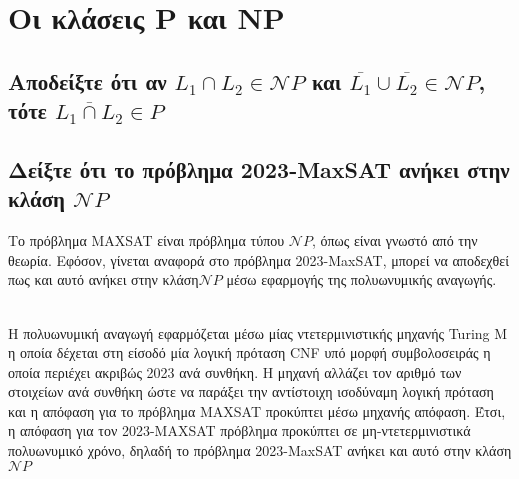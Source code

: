\section{Οι κλάσεις P και NP}

\subsection{Αποδείξτε ότι αν $L_1 \cap L_2 \in \mathcal{N}P$ και $\overline{L_1} \cup \overline{L_2} \in \mathcal{N}P$, τότε $\overline{L_1 \cap L_2} \in P$}
\subsection{Δείξτε ότι  το πρόβλημα 2023-MaxSAT ανήκει στην κλάση $\mathcal{N}P$}
\label{max_sat}
Το πρόβλημα MAXSAT είναι πρόβλημα τύπου $\mathcal{N}P$, όπως είναι γνωστό από την θεωρία. Εφόσον, γίνεται αναφορά στο πρόβλημα 2023-MaxSAT, μπορεί να αποδεχθεί πως και αυτό ανήκει στην κλάση$\mathcal{N}P$ μέσω εφαρμογής της πολυωνυμικής  αναγωγής.

\noindent\\
Η πολυωνυμική αναγωγή εφαρμόζεται μέσω μίας ντετερμινιστικής μηχανής Turing Μ η οποία δέχεται στη είσοδό μία λογική πρόταση CNF υπό μορφή συμβολοσειράς η οποία περιέχει ακριβώς 2023 ανά συνθήκη.  Η μηχανή αλλάζει τον αριθμό των στοιχείων ανά συνθήκη ώστε να παράξει την αντίστοιχη ισοδύναμη λογική πρόταση και η απόφαση για το πρόβλημα MAXSAT προκύπτει μέσω μηχανής απόφαση. Έτσι, η απόφαση για τον 2023-MAXSAT πρόβλημα προκύπτει  σε μη-ντετερμινιστικά πολυωνυμικό χρόνο, δηλαδή το πρόβλημα 2023-MaxSAT ανήκει και αυτό στην κλάση $\mathcal{N}P$